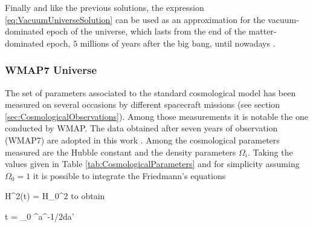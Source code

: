 Finally and like the previous solutions, the expression 
\ref{eq:VacuumUniverseSolution} can be used as an approximation for the
vacuum-dominated epoch of the universe, which lasts from the end of the
matter-dominated epoch, $5$ millions of years after the big bang, until 
nowadays \cite{longair2008}.



			\subsubsection*{WMAP7 Universe}
			
			
The set of parameters associated to the standard cosmological model has 
been measured on several occasions by different spacecraft missions (see
section \ref{sec:CosmologicalObservations}). Among those measurements it 
is notable the one conducted by WMAP. The data obtained after seven years
of observation (WMAP7) are adopted in this work \cite{WMAP7}. Among the 
cosmological parameters measured are the Hubble constant and the density
parameters $\Omega_i$. Taking the values given in Table 
\ref{tab:CosmologicalParameters} and for simplicity assuming $\Omega_0 = 1$
it is possible to integrate the Friedmann's equations

			
{ H^2(t) = H_0^2  }
to obtain


{ t = \int _0 ^{a}^{-1/2}da' }

